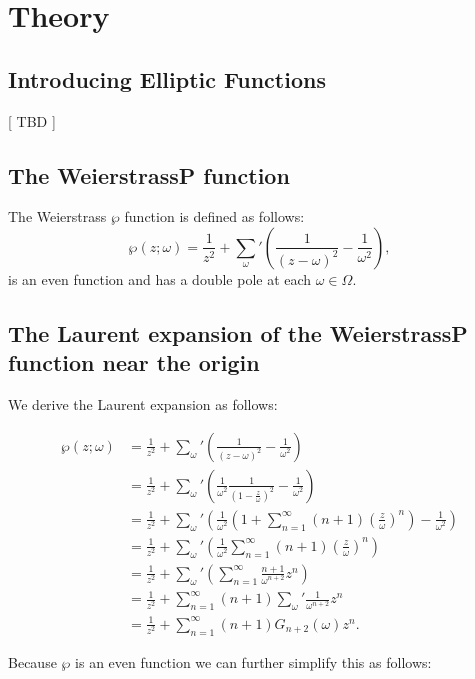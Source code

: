 \newpage
\section{Theory}


\subsection{Introducing Elliptic Functions}
[ TBD ]


\subsection{The WeierstrassP function}

The Weierstrass $\wp$ function is defined as follows:
\[
    \wp(z; \omega) = \frac{1}{z^2} + \sum_{\omega}{'} ( \frac{1}{(z-\omega)^2} - \frac{1}{\omega^2} ) ,
\]
is an even function and has a double pole at each $\omega \in \Omega$.


\subsection{The Laurent expansion of the WeierstrassP function near the origin}

We derive the Laurent expansion as follows:

\begin{align*}
    \wp(z; \omega) &= \frac{1}{z^2} + \sum_{\omega}{'} ( \frac{1}{(z-\omega)^2} - \frac{1}{\omega^2} )  \\
    &= \frac{1}{z^2} + \sum_{\omega}{'} ( \frac{1}{\omega^2} \frac{1}{(1-\frac{z}{\omega})^2} - \frac{1}{\omega^2} )  \\
    &= \frac{1}{z^2} + \sum_{\omega}{'} ( \frac{1}{\omega^2} ( 1 + \sum_{n=1}^{\infty} (n+1)( \frac{z}{\omega} )^n ) - \frac{1}{\omega^2} )  \\
    &= \frac{1}{z^2} + \sum_{\omega}{'} ( \frac{1}{\omega^2} \sum_{n=1}^{\infty} (n+1)( \frac{z}{\omega} )^n )  \\
    &= \frac{1}{z^2} + \sum_{\omega}{'} ( \sum_{n=1}^{\infty} \frac{n+1}{\omega^{n+2}}z^n )  \\
    &= \frac{1}{z^2} + \sum_{n=1}^{\infty} (n+1) \sum_{\omega}{'} \frac{1}{\omega^{n+2}}z^n  \\
    &= \frac{1}{z^2} + \sum_{n=1}^{\infty} (n+1) G_{n+2}(\omega) z^n .
\end{align*}

Because $\wp$ is an even function we can further simplify this as follows:

